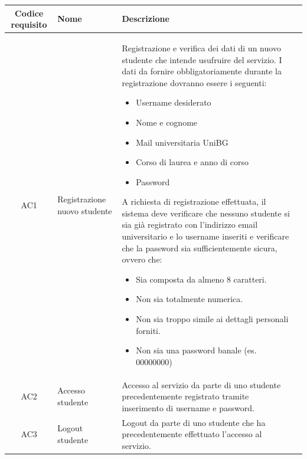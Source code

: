 \documentclass[10pt,a4paper]{report}
\begin{document}
	\begin{tabular}{cp{3cm}p{9cm}p{1cm}}
		Codice requisito&Nome&Descrizione\\ \hline
		AC1&Registrazione nuovo studente&Registrazione e verifica dei dati di un nuovo studente che intende usufruire del servizio. I dati da fornire obbligatoriamente durante la registrazione dovranno essere i seguenti:
		\begin{itemize}
			\item Username desiderato
			\item Nome e cognome
			\item Mail universitaria UniBG
			\item Corso di laurea e anno di corso
			\item Password
		\end{itemize}
		A richiesta di registrazione effettuata, il sistema deve verificare che nessuno studente si sia già registrato con l'indirizzo email universitario e lo username inseriti e verificare che la password sia sufficientemente sicura, ovvero che:
		\begin{itemize}
			\item Sia composta da almeno 8 caratteri.
			\item Non sia totalmente numerica.
			\item Non sia troppo simile ai dettagli personali forniti.
			\item Non sia una password banale (es. 00000000)
		\end{itemize}\\ \hline
		AC2&Accesso studente&Accesso al servizio da parte di uno studente precedentemente registrato tramite inserimento di username e password.\\ \hline
		AC3&Logout studente&Logout da parte di uno studente che ha precedentemente effettuato l'accesso al servizio.\\ \hline
	\end{tabular}
\end{document}
